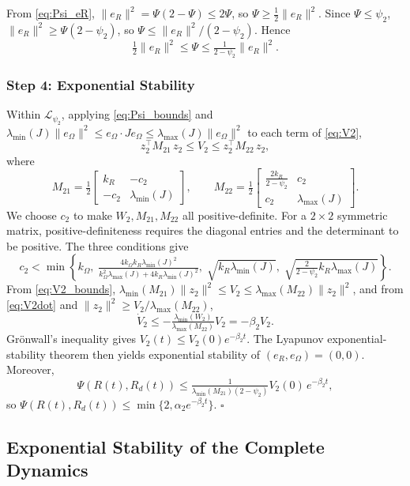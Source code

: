 \documentclass[11pt]{article}
\theoremstyle{remark}
\newcommand{\lmin}{\lambda_{\min}}
\newcommand{\lmax}{\lambda_{\max}}
\begin{document}
From \eqref{eq:Psi_eR}, $\|e_R\|^2 = \Psi(2-\Psi) \le 2\Psi$, so $\Psi \ge \tfrac{1}{2}\|e_R\|^2$. Since $\Psi\le\psi_2$, $\|e_R\|^2 \ge \Psi(2-\psi_2)$, so $\Psi \le \|e_R\|^2/(2-\psi_2)$. Hence
\begin{equation}
\tfrac{1}{2}\|e_R\|^2 \le \Psi \le \tfrac{1}{2-\psi_2}\|e_R\|^2.
\label{eq:Psi_bounds}
\end{equation}

\subsubsection*{Step 4: Exponential Stability}
Within $\mathcal{L}_{\psi_2}$, applying \eqref{eq:Psi_bounds} and $\lmin(J)\|e_\Omega\|^2 \le e_\Omega\cdot Je_\Omega \le \lmax(J)\|e_\Omega\|^2$ to each term of \eqref{eq:V2},
\begin{equation}
z_2^\top M_{21}\, z_2 \le V_2 \le z_2^\top M_{22}\, z_2,
\label{eq:V2_bounds}
\end{equation}
where
\[
M_{21} = \tfrac{1}{2}\begin{bmatrix} k_R & -c_2 \\ -c_2 & \lmin(J) \end{bmatrix}, \qquad
M_{22} = \tfrac{1}{2}\begin{bmatrix} \frac{2k_R}{2-\psi_2} & c_2 \\ c_2 & \lmax(J) \end{bmatrix}.
\]
We choose $c_2$ to make $W_2, M_{21}, M_{22}$ all positive-definite. For a $2\times 2$ symmetric matrix, positive-definiteness requires the diagonal entries and the determinant to be positive. The three conditions give
\begin{equation}
c_2 < \min\left\{k_\Omega,\; \tfrac{4k_\Omega k_R \lmin(J)^2}{k_\Omega^2\lmax(J) + 4k_R\lmin(J)^2},\; \sqrt{k_R\lmin(J)},\; \sqrt{\tfrac{2}{2-\psi_2}k_R\lmax(J)}\right\}.
\label{eq:c2_choice}
\end{equation}
From \eqref{eq:V2_bounds}, $\lmin(M_{21})\|z_2\|^2 \le V_2 \le \lmax(M_{22})\|z_2\|^2$, and from \eqref{eq:V2dot} and $\|z_2\|^2 \ge V_2/\lmax(M_{22})$,
\[
\dot V_2 \le -\tfrac{\lmin(W_2)}{\lmax(M_{22})}V_2 = -\beta_2 V_2.
\]
Gr\"onwall's inequality gives $V_2(t)\le V_2(0)e^{-\beta_2 t}$. The Lyapunov exponential-stability theorem then yields exponential stability of $(e_R, e_\Omega) = (0, 0)$. Moreover,
\[
\Psi(R(t), R_d(t)) \le \tfrac{1}{\lmin(M_{21})(2-\psi_2)} V_2(0)\,e^{-\beta_2 t},
\]
so $\Psi(R(t),R_d(t)) \le \min\{2,\alpha_2 e^{-\beta_2 t}\}$. $\square$

\subsection{Exponential Stability of the Complete Dynamics}
\label{sec:prop2}
\end{document}
